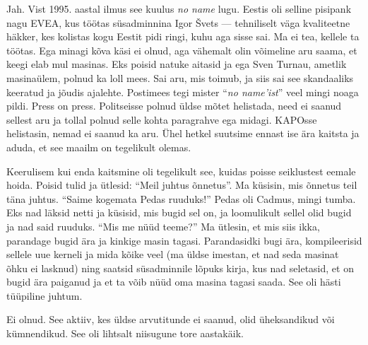 
Jah. Vist 1995. aastal ilmus see kuulus \emph{no name} 
lugu. Eestis oli selline pisipank nagu EVEA, kus töötas süsadminnina Igor 
Švets --- tehniliselt väga 
kvaliteetne häkker, kes kolistas kogu Eestit pidi ringi, kuhu aga sisse sai. Ma 
ei tea, kellele ta töötas. Ega minagi kõva käsi ei 
olnud, aga vähemalt olin võimeline aru saama, et keegi elab mul 
masinas. Eks poisid natuke aitasid ja ega Sven Turnau, 
ametlik masinaülem, polnud ka loll mees. Sai aru, mis toimub, ja siis sai see 
skandaaliks keeratud ja jõudis ajalehte. Postimees tegi mister \enquote{\emph{no name'ist}} veel mingi noaga pildi. Press on press. 
Politseisse polnud üldse mõtet helistada, need ei saanud sellest aru ja tollal 
polnud selle kohta paragrahve ega midagi. KAPOsse helistasin, nemad ei saanud ka aru. Ühel hetkel suutsime ennast ise ära kaitsta ja aduda, et see maailm 
on tegelikult olemas. 

Keerulisem kui enda kaitsmine oli tegelikult see, 
kuidas poisse seiklustest eemale hoida. Poisid tulid ja
ütlesid: \enquote{Meil juhtus õnnetus}. Ma küsisin, mis 
õnnetus teil täna juhtus. \enquote{Saime kogemata Pedas ruuduks!} 
Pedas oli Cadmus, mingi 
tumba. Eks nad läksid netti ja küsisid, mis bugid sel on, ja 
loomulikult sellel olid bugid ja nad said ruuduks. \enquote{Mis me nüüd teeme?} Ma 
ütlesin, et mis siis ikka, parandage bugid ära ja kinkige masin 
tagasi. Parandasidki bugi ära, kompileerisid sellele uue kerneli ja mida kõike veel (ma üldse imestan, et nad seda masinat õhku ei lasknud) ning
saatsid süsadminnile lõpuks kirja, kus nad seletasid, et on bugid ära 
paiganud ja et ta võib nüüd oma masina tagasi saada. See oli hästi 
tüüpiline juhtum.


Ei olnud. See aktiiv, kes üldse arvutitunde ei saanud, olid üheksandikud või 
kümnendikud. See oli lihtsalt niisugune tore aastakäik. 


